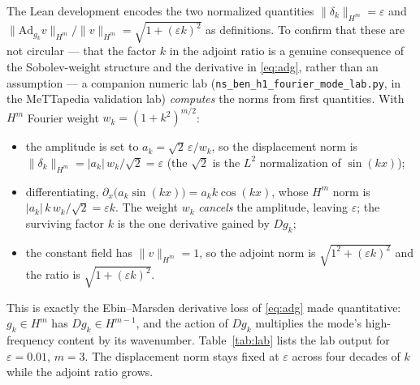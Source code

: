 \documentclass[11pt]{article}
\theoremstyle{definition}
\newcommand{\Ad}{\mathrm{Ad}}
\newcommand{\Hm}{H^m}
\begin{document}
The Lean development encodes the two normalized quantities
$\|\delta_k\|_{\Hm}=\varepsilon$ and
$\|\Ad_{g_k}v\|_{\Hm}/\|v\|_{\Hm}=\sqrt{1+(\varepsilon k)^2}$ as definitions. To
confirm that these are not circular --- that the factor $k$ in the adjoint ratio
is a genuine consequence of the Sobolev-weight structure and the derivative in
\eqref{eq:adg}, rather than an assumption --- a companion numeric lab
(\texttt{ns\_ben\_h1\_fourier\_mode\_lab.py}, in the MeTTapedia validation lab)
\emph{computes} the norms from first quantities. With $\Hm$ Fourier weight
$w_k = (1+k^2)^{m/2}$:
\begin{itemize}
  \item the amplitude is set to $a_k = \sqrt{2}\,\varepsilon / w_k$, so the
        displacement norm is
        $\|\delta_k\|_{\Hm} = |a_k|\,w_k/\sqrt{2} = \varepsilon$
        (the $\sqrt2$ is the $L^2$ normalization of $\sin(kx)$);
  \item differentiating, $\partial_x\bigl(a_k\sin(kx)\bigr)=a_k k\cos(kx)$, whose
        $\Hm$ norm is $|a_k|\,k\,w_k/\sqrt{2} = \varepsilon k$. The weight $w_k$
        \emph{cancels} the amplitude, leaving $\varepsilon$; the surviving factor
        $k$ is the one derivative gained by $D g_k$;
  \item the constant field has $\|v\|_{\Hm}=1$, so the adjoint norm is
        $\sqrt{1^2+(\varepsilon k)^2}$ and the ratio is
        $\sqrt{1+(\varepsilon k)^2}$.
\end{itemize}
This is exactly the Ebin--Marsden derivative loss of \eqref{eq:adg} made
quantitative: $g_k\in\Hm$ has $Dg_k\in H^{m-1}$, and the action of $Dg_k$
multiplies the mode's high-frequency content by its wavenumber. Table~\ref{tab:lab}
lists the lab output for $\varepsilon=0.01$, $m=3$. The displacement norm stays
fixed at $\varepsilon$ across four decades of $k$ while the adjoint ratio grows.
\end{document}
